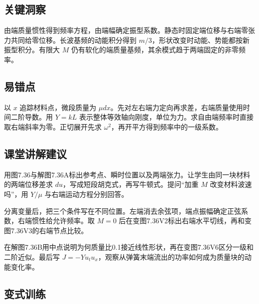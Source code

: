 \documentclass[UTF8,fontset=fandol,a4paper,11pt]{ctexart}
\begin{document}

\subsection*{关键洞察}

由端质量惯性得到频率方程，由端幅确定振型系数。静态时固定端位移与右端零张力共同给零位移。长波基频的动能积分得到 $m/3$，形状改变时动能、势能都按新振型积分。有限大 $M$ 仍有软化的端质量基频，其余模式趋于两端固定的非零频率。




\subsection*{易错点}

以 $x$ 追踪材料点，微段质量为 $\mu dx$。先对左右端力定向再求差，右端质量使用时间二阶导数。用 $Y=kL$ 表示整体等效轴向刚度，单位为力。求自由端频率时直接取右端斜率为零。正切展开先求 $\omega^2$，再开平方得到频率中的一级系数。




\subsection*{课堂讲解建议}

用图7.36与解图7.36A标出参考点、瞬时位置以及两端张力。让学生由同一块材料的两端位移差求 $du$，写成短段胡克式，再写牛顿式。提问“加重 $M$ 改变材料波速吗”，用 $Y/\mu$ 与右端运动方程分别回答。

分离变量后，把三个条件写在不同位置。左端消去余弦项，端点振幅确定正弦系数，右端惯性给允许频率。取 $M=0$ 后在变图7.36V2标出右端水平切线，再和变图7.36V3的右端节点比较。

在解图7.36B用中点说明为何质量比0.1接近线性形状，再在变图7.36V6区分一级和二阶近似。最后写 $J=-Yu_tu_x$，观察从弹簧末端流出的功率如何成为质量块的动能变化率。




\subsection*{变式训练}
\end{document}
